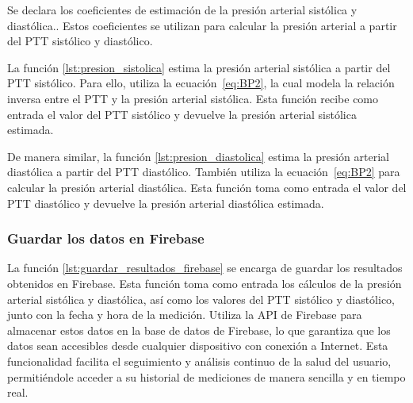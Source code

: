         Se declara los coeficientes de estimación de la presión arterial sistólica y diastólica.. Estos coeficientes se utilizan para calcular la presión arterial a partir del PTT sistólico y diastólico.

        

        La función \ref{lst:presion_sistolica} estima la presión arterial sistólica a partir del PTT sistólico. Para ello, utiliza la ecuación~\ref{eq:BP2}, la cual modela la relación inversa entre el PTT y la presión arterial sistólica. Esta función recibe como entrada el valor del PTT sistólico y devuelve la presión arterial sistólica estimada.

        

        De manera similar, la función \ref{lst:presion_diastolica} estima la presión arterial diastólica a partir del PTT diastólico. También utiliza la ecuación~\ref{eq:BP2} para calcular la presión arterial diastólica. Esta función toma como entrada el valor del PTT diastólico y devuelve la presión arterial diastólica estimada.

        

        \subsubsection{Guardar los datos en Firebase}

        La función \ref{lst:guardar_resultados_firebase} se encarga de guardar los resultados obtenidos en Firebase. Esta función toma como entrada los cálculos de la presión arterial sistólica y diastólica, así como los valores del PTT sistólico y diastólico, junto con la fecha y hora de la medición. Utiliza la API de Firebase para almacenar estos datos en la base de datos de Firebase, lo que garantiza que los datos sean accesibles desde cualquier dispositivo con conexión a Internet. Esta funcionalidad facilita el seguimiento y análisis continuo de la salud del usuario, permitiéndole acceder a su historial de mediciones de manera sencilla y en tiempo real.

